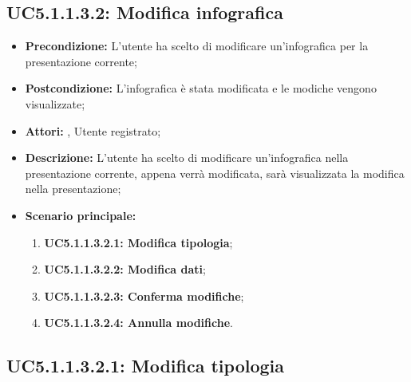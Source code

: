 \subsection{ UC5.1.1.3.2: Modifica infografica}

\begin{itemize}
	\item \textbf{Precondizione:} L'utente ha scelto di modificare un'infografica per la presentazione corrente;
	\item \textbf{Postcondizione:} L'infografica è stata modificata e le modiche vengono visualizzate;
	\item \textbf{Attori:} , Utente registrato;
	\item \textbf{Descrizione:} L'utente ha scelto di modificare un'infografica nella presentazione corrente, appena verrà modificata, sarà visualizzata la modifica nella presentazione;
	\item \textbf{Scenario principale:}
	\begin{enumerate}
		\item \textbf{ UC5.1.1.3.2.1: Modifica tipologia};
		\item \textbf{ UC5.1.1.3.2.2: Modifica dati};
		\item \textbf{ UC5.1.1.3.2.3: Conferma modifiche};
		\item \textbf{ UC5.1.1.3.2.4: Annulla modifiche}.
	\end{enumerate}
\end{itemize}
\subsection{ UC5.1.1.3.2.1: Modifica tipologia}

